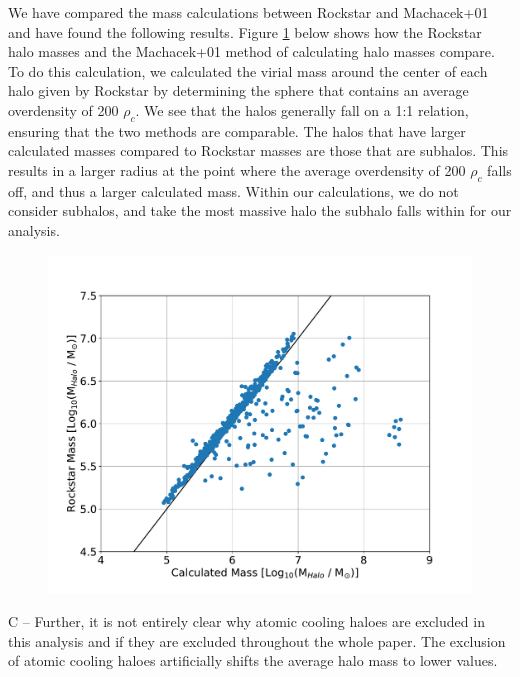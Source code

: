 \documentclass[11pt]{article}
\newenvironment{referee}[1][]{%
    \ignorespaces%
    \begin{mdframed}[style=myquotestyle,#1]%
}{%
    \end{mdframed}%
    \ignorespacesafterend%
}%
\begin{document}
We have compared the mass calculations between Rockstar and Machacek+01 and have found the following results. Figure \ref{fig:compare_mass} below shows how the Rockstar halo masses and the Machacek+01 method of calculating halo masses compare. To do this calculation, we calculated the virial mass around the center of each halo given by Rockstar by determining the sphere that contains an average overdensity of 200 $\rho_{c}$. We see that the halos generally fall on a 1:1 relation, ensuring that the two methods are comparable. The halos that have larger calculated masses compared to Rockstar masses are those that are subhalos. This results in a larger radius at the point where the average overdensity of 200 $\rho_{c}$ falls off, and thus a larger calculated mass. Within our calculations, we do not consider subhalos, and take the most massive halo the subhalo falls within for our analysis.

\begin{figure}[ht!]
	\centering
	\includegraphics[keepaspectratio=true, scale=0.4]{images/compare_halo_mass.pdf}
  \caption{\label{fig:compare_mass} }
\end{figure}

\begin{referee}
C -- Further, it is not entirely clear why atomic cooling haloes are excluded in this analysis and if they are excluded throughout the whole paper. The exclusion of atomic cooling haloes artificially shifts the average halo mass to lower values.
\end{referee}
\end{document}
